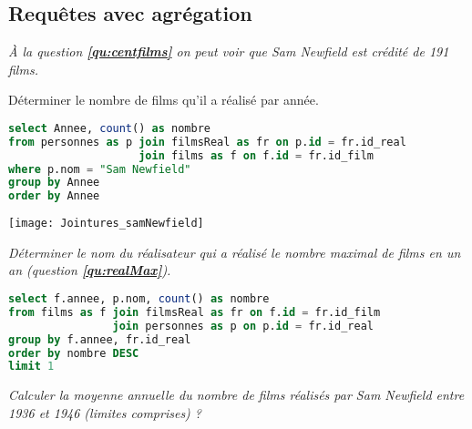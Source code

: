\subsection{Requêtes avec agrégation}
\begin{Exercise} \it À la question {\bf \ref{qu:centfilms}} on peut voir que Sam Newfield est crédité de 191 films. 

Déterminer le nombre de films qu'il a réalisé par année.
\end{Exercise}
\begin{Answer}
\begin{lstlisting}[language=SQL]
select Annee, count() as nombre
from personnes as p join filmsReal as fr on p.id = fr.id_real
                    join films as f on f.id = fr.id_film
where p.nom = "Sam Newfield"
group by Annee
order by Annee
\end{lstlisting}
\begin{center}
    \texttt{[image: Jointures\_samNewfield]}
  \end{center}
\end{Answer}
\begin{Exercise} \it Déterminer le nom du réalisateur qui a réalisé le nombre maximal de films en un an (question {\bf \ref{qu:realMax}}).
\end{Exercise}
\begin{Answer}
\begin{lstlisting}[language=SQL]
select f.annee, p.nom, count() as nombre
from films as f join filmsReal as fr on f.id = fr.id_film
                join personnes as p on p.id = fr.id_real
group by f.annee, fr.id_real
order by nombre DESC
limit 1
\end{lstlisting}
\end{Answer}
\begin{Exercise} \it Calculer la moyenne annuelle du nombre de films réalisés par Sam Newfield entre 1936 et 1946 (limites comprises) ?
\end{Exercise}
